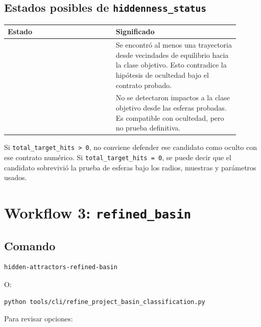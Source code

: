 \documentclass[11pt,letterpaper]{article}
\begin{document}
\subsection{Estados posibles de \texttt{hiddenness\_status}}

\begin{center}
\begin{tabular}{L{0.42\linewidth}L{0.48\linewidth}}
\toprule
Estado & Significado \\
\midrule
{} & Se encontró al menos una trayectoria desde vecindades de equilibrio hacia la clase objetivo. Esto contradice la hipótesis de ocultedad bajo el contrato probado. \\
 & No se detectaron impactos a la clase objetivo desde las esferas probadas. Es compatible con ocultedad, pero no prueba definitiva. \\
\bottomrule
\end{tabular}
\end{center}

\begin{advertencia}
Si \texttt{total\_target\_hits > 0}, no conviene defender ese candidato como oculto con ese contrato numérico. Si \texttt{total\_target\_hits = 0}, se puede decir que el candidato sobrevivió la prueba de esferas bajo los radios, muestras y parámetros usados.
\end{advertencia}

\section{Workflow 3: \texttt{refined\_basin}}

\subsection{Comando}

\begin{lstlisting}[style=terminal]
hidden-attractors-refined-basin
\end{lstlisting}

O:

\begin{lstlisting}[style=terminal]
python tools/cli/refine_project_basin_classification.py
\end{lstlisting}

Para revisar opciones:
\end{document}
